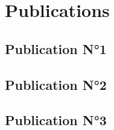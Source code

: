 \part{Publications}

\chapter{Publication N°1}
 

\cleardoublepage

\chapter{Publication N°2}
 

\chapter{Publication N°3}
 


%
